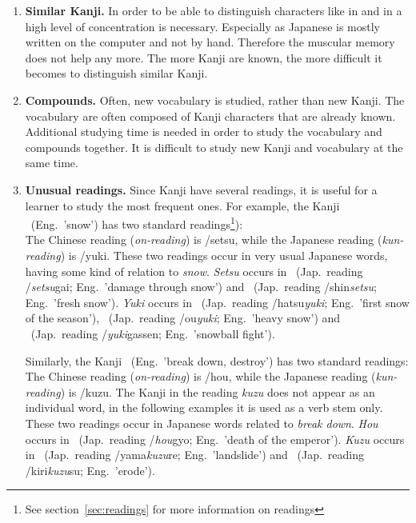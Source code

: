 \begin{enumerate}
  \item \textbf{Similar Kanji.} In order to be able to distinguish characters 
        like  in  and  in  a high level of
        concentration is necessary. Especially as Japanese is mostly written
        on the computer and not by hand. Therefore the muscular memory 
        does not help any more. The more Kanji are known, the more 
        difficult it becomes to distinguish similar Kanji.

  \item \textbf{Compounds.} Often, new vocabulary is studied, rather than new 
        Kanji. The vocabulary are often composed of Kanji characters that are 
        already known. Additional studying time is needed in order to study the 
        vocabulary and compounds together. It is difficult to study new Kanji    
        and vocabulary at the same time.
        
  \item \textbf{Unusual readings.} Since Kanji have several readings, 
        it is useful for a learner to study the most frequent ones.
        For example, the Kanji ~(Eng.\ 'snow') has two 
        standard 
        readings\footnote{See section~\ref{sec:readings} for more information 
          on readings}):\\
        The Chinese reading (\emph{on-reading}) is /setsu, 
        while the Japanese reading (\emph{kun-reading}) is /yuki.
        These two readings occur in very usual Japanese words, having 
        some kind of relation to \emph{snow}. \emph{Setsu} occurs in
        ~(Jap.\ reading /\emph{setsu}gai; 
        Eng.\ 'damage through snow') and
        ~(Jap.\ reading /shin\emph{setsu}; 
        Eng.\ 'fresh snow').
        \emph{Yuki} occurs in
        ~(Jap.\ reading /hatsu\emph{yuki}; 
        Eng.\ 'first snow of the season'),
        ~(Jap.\ reading /ou\emph{yuki}; 
        Eng.\ 'heavy snow') and
        ~(Jap.\ reading /\emph{yuki}gassen; 
        Eng.\ 'snowball fight'). 

        Similarly, the Kanji ~(Eng.\ 'break down, destroy') 
        has two standard readings:\\
        The Chinese reading (\emph{on-reading}) is /hou, 
        while the Japanese reading (\emph{kun-reading}) is /kuzu.
        The Kanji  in the reading \emph{kuzu} does not appear as an 
        individual word, in the following examples it is used as a 
        verb stem only. These two readings occur in Japanese words related to 
        \emph{break down}. \emph{Hou} occurs in 
        ~(Jap.\ reading /\emph{hou}gyo; 
        Eng.\ 'death of the emperor').
        \emph{Kuzu} occurs in 
        ~(Jap.\ reading /yama\emph{kuzu}re; 
        Eng.\ 'landslide') and 
        ~(Jap.\ reading /kiri\emph{kuzu}su; 
        Eng.\ 'erode').


\end{enumerate}
